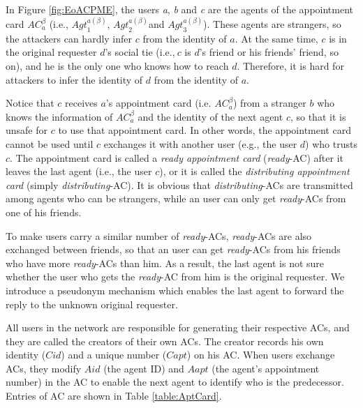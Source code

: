 In Figure \ref{fig:EoACPME}, the users \textit{a}, \textit{b} and \textit{c} are the agents of the appointment card ${AC}^{\beta }_a$ (i.e., ${Agt}^{a\left(\beta \right)}_1$, ${Agt}^{a\left(\beta \right)}_2$and ${Agt}^{a\left(\beta \right)}_3$). These agents are strangers, so the attackers can hardly infer $c$ from the identity of $a$. At the same time, $c$ is in the original requester $d$'s social tie (i.e.,$\ c$ is $d$'s friend or his friends' friend, so on), and he is the only one who knows how to reach $d$. Therefore, it is hard for attackers to infer the identity of $d$ from the identity of $a$.

Notice that $c$ receives $a$'s appointment card (i.e. ${AC}^{\beta }_a$) from a stranger $b$ who knows the information of ${AC}^{\beta }_a$ and the identity of the next agent $c$, so that it is unsafe for $c$ to use that appointment card. In other words, the appointment card cannot be used until $c$ exchanges it with another user (e.g., the user $d$) who trusts $c$. The appointment card is called a \textit{ready appointment card} (\textit{ready}-AC) after it leaves the last agent (i.e., the user $c$), or it is called the \textit{distributing appointment card} (simply \textit{distributing}-AC). It is obvious that \textit{distributing}-ACs are transmitted among agents who can be strangers, while an user can only get \textit{ready}-ACs from  one of his friends.

To make users carry a similar number of \textit{ready}-ACs, \textit{ready}-ACs are also exchanged between friends, so that an user can get \textit{ready}-ACs from his friends who have more \textit{ready}-ACs than him. As a result, the last agent is not sure whether the user who gets the \textit{ready}-AC from him is the original requester. We introduce a pseudonym mechanism which enables the last agent to forward the reply to the unknown original requester. 

All users in the network are responsible for generating their respective ACs, and they are called the creators of their own ACs. The creator records his own identity ($Cid$) and a unique number ($Capt$) on his AC. When users exchange ACs, they modify $Aid$ (the agent ID) and ${Aapt}$ (the agent's appointment number) in the AC to enable the next agent to identify who is the predecessor. Entries of AC are shown in Table \ref{table:AptCard}.


